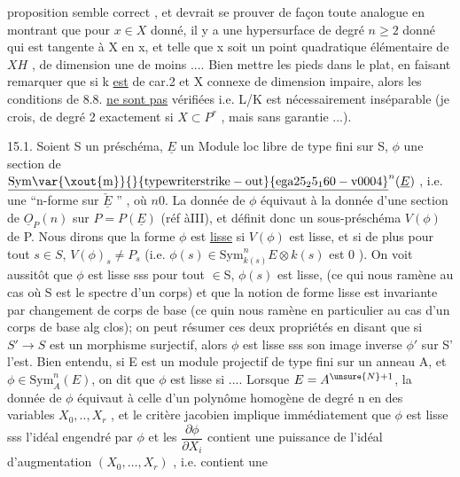 
proposition semble correct , et devrait se prouver de façon toute analogue
en montrant que pour $x\in X$ donné, il y a une hypersurface  de degré $n\geqslant 2$
donné qui est tangente à X en x, et telle que x soit un point quadratique
élémentaire de $X$\hand{\unsure{$\cap$}}$H$ , de dimension une de moins .... Bien mettre les
pieds dans le plat, en faisant remarquer que si k \uline{est} de car.2 et X
connexe  de dimension impaire, alors les conditions de 8.8. \uline{ne sont pas}
vérifiées i.e. L/K est nécessairement inséparable (je crois, de degré
2 exactement si $X\subset P^r$ , mais sans garantie ...).

15.1. Soient S un préschéma, $\underline{E}$ un Module loc libre de type fini
sur S, $\phi$ une section de $\underline{\mathrm{Sym\var{\xout{m}}{}{typewriter strike-out}{ega25_25_160-v0004}}}^n(\underline{E})$ , i.e. une ``n-forme sur $\check{\underline{E}}$ '' , où $n$$0$.
La donnée de $\phi$ équivaut à la donnée d'une section de $\underline{O}_P(n)$ sur $P=P(\underline{E})$
(réf àIII), et définit donc un sous-préschéma $V(\phi)$ de P. Nous dirons que
la forme $\phi$ est \uline{lisse} si $V(\phi)$ est lisse, et si de plus pour tout $s\in S$,
$V(\phi)_s\neq P_s$ (i.e. $\phi(s)\in \mathrm{Sym}^n_{k(s)}E\otimes k(s)$ est $0$ ). On voit aussitôt
que $\phi$ est lisse sss pour tout  $\in$S, $\phi(s)$ est lisse, 
(ce qui nous ramène au cas où S est le spectre d'un corps) et
que la notion de forme lisse est invariante par changement de corps de
base (ce quin nous ramène en particulier au cas d'un corps de base alg
clos); on peut résumer ces deux propriétés en disant que si $S'\to S$ est
un morphisme surjectif, alors $\phi$ est lisse sss son image inverse $\phi'$ sur S'
l'est. Bien entendu, si E est un module projectif de type fini sur un
anneau A, et $\phi\in\mathrm{Sym}^n_A(E)$, on dit que $\phi$ est lisse si .... Lorsque $E=A^{\unsure{N}+1}$,
la donnée de $\phi$ équivaut à celle d'un polynôme homogène de degré n
en des variables $X_0,..,X_r$ , et le critère jacobien implique immédiatement
que  $\phi$ est lisse sss l'idéal engendré par $\phi$ et les $\dfrac{\partial\phi}{\partial X_i}$ contient
une puissance de l'idéal d'augmentation $(X_0,\dots,X_r)$ , i.e. contient une


